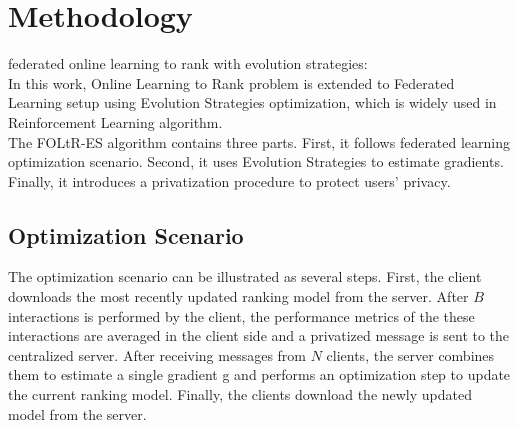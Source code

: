 
\section{Methodology}\label{sec:method}


federated online learning to rank with evolution strategies:\\
In this work, Online Learning to Rank problem is extended to Federated Learning setup using Evolution Strategies optimization, which is widely used in Reinforcement Learning algorithm.\\
The FOLtR-ES algorithm contains three parts. First, it follows federated learning optimization scenario. Second, it uses Evolution Strategies to estimate gradients. Finally, it introduces a privatization procedure to protect users' privacy.

\subsection{ Optimization Scenario}
The optimization scenario can be illustrated as several steps. First, the client downloads the most recently updated ranking model from the server. After $B$ interactions is performed by the client, the performance metrics of the these interactions are averaged in the client side and a privatized message is sent to the centralized server. After receiving messages from $N$ clients, the server combines them to estimate a single gradient g and performs an optimization step to update the current ranking model. Finally, the clients download the newly updated model from the server.

